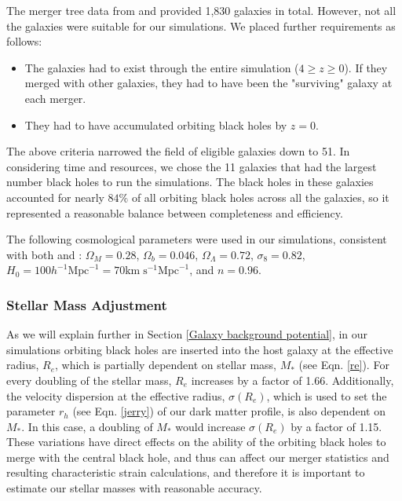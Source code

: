 \documentclass[fleqn,usenatbib,useAMS]{mnras}
\begin{document}
The merger tree data from \citet{2012MNRAS.425..641L} and \citet{2015ApJ...799..178K} provided 1,830 galaxies in total.  However, not all the galaxies were suitable for our simulations.  We placed further requirements as follows:
\begin{itemize}
\item The galaxies had to exist through the entire simulation ($4\geq z \geq 0$).  If they merged with other galaxies, they had to have been the "surviving" galaxy at each merger.
\item They had to have accumulated orbiting black holes by $z = 0$.
\end{itemize}

The above criteria narrowed the field of eligible galaxies down to 51.  In considering time and resources, we chose the 11 galaxies that had the largest number black holes to run the simulations.  The black holes in these galaxies accounted for nearly $84{\%}$ of all orbiting black holes across all the galaxies, so it represented a reasonable balance between completeness and efficiency.

The following cosmological parameters were used in our simulations, consistent with both \citet{2012MNRAS.425..641L} and \citet{2015ApJ...799..178K}:   $\Omega_M = 0.28$, $\Omega_b = 0.046$, $\Omega_\Lambda = 0.72$, $\sigma_8 = 0.82$, $H_0 = 100h^{-1}\mathrm{Mpc}^{-1} = 70 \mathrm{km}\;\mathrm{s}^{-1} \mathrm{Mpc}^{-1}$, and $n = 0.96$.

\subsubsection{Stellar Mass Adjustment}
As we will explain further in Section \ref{Galaxy background potential}, in our simulations orbiting black holes are inserted into the host galaxy at the effective radius, $R_e$, which is partially dependent on stellar mass, $M_*$ (see Eqn. \ref{re}).  For every doubling of the stellar mass, $R_e$ increases by a factor of 1.66.  Additionally, the velocity dispersion at the effective radius, $\sigma(R_e)$, which is used to set the parameter $r_h$ (see Eqn. \ref{jerry}) of our dark matter profile, is also dependent on $M_*$.  In this case, a doubling of $M_*$ would increase $\sigma(R_e)$ by a factor of 1.15.  These variations have direct effects on the ability of the orbiting black holes to merge with the central black hole, and thus can affect our merger statistics and resulting characteristic strain calculations, and therefore it is important to estimate our stellar masses with reasonable accuracy.
\end{document}
